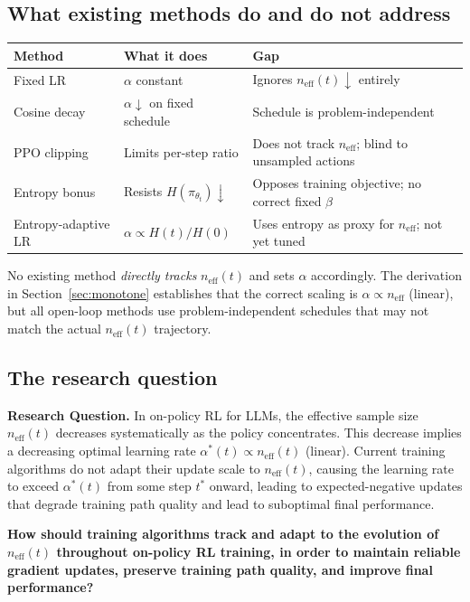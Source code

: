 \documentclass[11pt,a4paper]{article}
\newcommand{\neff}{n_{\mathrm{eff}}}
\newcommand{\pith}{\pi_{\theta_t}}
\newcommand{\alphaopt}{\alpha^*(t)}
\begin{document}
\subsection{What existing methods do and do not address}

\begin{center}
\begin{tabular}{lll}
\toprule
\textbf{Method} & \textbf{What it does} & \textbf{Gap} \\
\midrule
Fixed LR & $\alpha$ constant & Ignores $\neff(t) \downarrow$ entirely \\
Cosine decay & $\alpha \downarrow$ on fixed schedule & Schedule is problem-independent \\
PPO clipping & Limits per-step ratio & Does not track $\neff$; blind to unsampled actions \\
Entropy bonus & Resists $H(\pith) \downarrow$ & Opposes training objective; no correct fixed $\beta$ \\
Entropy-adaptive LR & $\alpha \propto H(t)/H(0)$ & Uses entropy as proxy for $\neff$; not yet tuned \\
\bottomrule
\end{tabular}
\end{center}

No existing method \emph{directly tracks} $\neff(t)$ and sets $\alpha$ accordingly.
The derivation in Section~\ref{sec:monotone} establishes that the correct scaling is $\alpha \propto \neff$
(linear), but all open-loop methods use problem-independent schedules that may not match
the actual $\neff(t)$ trajectory.

\subsection{The research question}

\begin{rqbox}
\textbf{Research Question.}
In on-policy RL for LLMs, the effective sample size $\neff(t)$ decreases systematically
as the policy concentrates.
This decrease implies a decreasing optimal learning rate $\alphaopt \propto \neff(t)$ (linear).
Current training algorithms do not adapt their update scale to $\neff(t)$,
causing the learning rate to exceed $\alphaopt$ from some step $t^*$ onward,
leading to expected-negative updates that degrade training path quality
and lead to suboptimal final performance.

\medskip
\textbf{How should training algorithms track and adapt to the evolution of $\neff(t)$
throughout on-policy RL training, in order to maintain reliable gradient updates,
preserve training path quality, and improve final performance?}
\end{rqbox}
\end{document}
